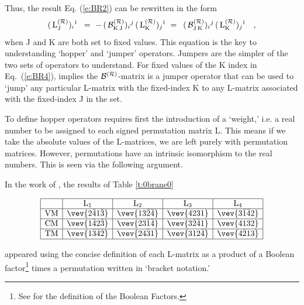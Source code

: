\documentclass[12pt]{article}
\def\rJ{{\rm J}}
\def\rK{{\rm K}}
\def\rL{{\rm L}}
\def\hi{{\hat\imath}}
\def\be{\begin{equation}}
\def\ee{\end{equation}}
\def\i{\iota}
\let\bm\relax
\newcommand{\bm}[1]{{\boldsymbol{#1}}}
\begin{document}
Thus, the result Eq. (\ref{e:BR2}) can be rewritten in the form
 \be{ 
 (\,{\rm L}^{(\cal R)}_\rJ
 )_\i{}^\hi\> ~=~ -\,  (\,{\cal B}^{(\cal R)}_{\rK \, \rJ})_i{}^j \, (\,{\rm L}^{(\cal R)}_\rK){}_j{}^\hi
 ~=~ \,  (\,{\cal B}^{(\cal R)}_{\rJ \, \rK})_i{}^j \, (\,{\rm L}^{(\cal R)}_\rK){}_j{}^\hi~~~,
 }
  \label{e:BR4}
\ee
when J and K are both set to fixed values.
This equation is the key to understanding `hopper' and `jumper' operators. 
 Jumpers are the simpler of 
the two sets of operators to understand. \cite{36} For fixed values of the K index in  Eq.\ (\ref{e:BR4}), implies the
${\cal B}^{({\cal R)}}$-matrix is a jumper operator that can be used to `jump' any particular L-matrix with 
the fixed-index K to any L-matrix associated with the fixed-index J in the set. %

To define hopper operators requires first the introduction of a `weight,' i.e. 
a real number to be assigned to each signed permutation
matrix L.  This means if we take the absolute values of the L-matrices,
we are left purely with permutation matrices.  However, permutations
have an intrinsic isomorphism to the real numbers.  This is seen via
the following argument.

In the work of \cite{3}%
, the results of Table \ref{t:0brane0}

\begin{table}[H]
\setlength\extrarowheight{2pt}
$$
    \begin{array}{|c|c|c|c|c|c|c|} 
   \hline
 & {\bm {\rL}}_1 & {\bm {\rL}}_2 & {\bm {\rL}}_3 & {\bm {\rL}}_4  \\  \hline
{\rm VM} & \vev{2\bar41\bar3} & \vev{13\bar2\bar4} & \vev{4231} & \vev{3\bar1\bar42}
\\ \hline
{\rm CM} & \vev{1\bar42\bar3} & \vev{23\bar1\bar4} &  \vev{3\bar2\bar41} & \vev{4132} 
\\ \hline
{\rm TM} & \vev{1\bar3\bar4\bar2} & \vev{24\bar31} & \vev{312\bar4} & \vev{4\bar213}
\\ \hline
    \end{array}
$$
    \caption{Signed Permutation Element Decomposition of L-matrices}
    \label{t:0brane0}
\end{table}  \noindent
appeared using the concise definition of each L-matrix as a product of a Boolean
factor\footnote{See \cite{permutadnk} for the definition of the Boolean Factors.} times
a permutation written in `bracket notation.'
\end{document}
